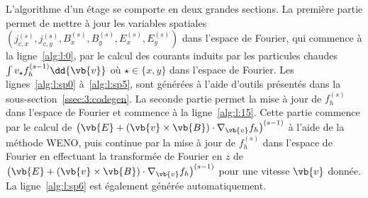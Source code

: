 L'algorithme d'un étage se comporte en deux grandes sections. La première partie permet de mettre à jour les variables spatiales $(j_{c,x}^{(s)},j_{c,y}^{(s)},B_x^{(s)},B_y^{(s)},E_x^{(s)},E_y^{(s)})$ dans l'espace de Fourier, qui commence à la ligne~\ref{alg:l:0}, par le calcul des courants induits par les particules chaudes $\int v_\star f_h^{(s-1)}\dd{\vb{v}}$ où $\star\in\{x,y\}$ dans l'espace de Fourier. Les lignes~\ref{alg:l:sp0} à~\ref{alg:l:sp5}, sont générées à l'aide d'outils présentés dans la sous-section~\ref{ssec:3:codegen}. La seconde partie permet la mise à jour de $f_h^{(s)}$ dans l'espace de Fourier et commence à la ligne~\ref{alg:l:15}. Cette partie commence par le calcul de $\left(\vb{E}+(\vb{v}\times\vb{B})\cdot\nabla_{\vb{v}}f_h\right)^{(s-1)}$ à l'aide de la méthode WENO, puis continue par la mise à jour de $f_h^{(s)}$ dans l'espace de Fourier en effectuant la transformée de Fourier en $z$ de $\left(\vb{E}+(\vb{v}\times\vb{B})\cdot\nabla_{\vb{v}}f_h\right)^{(s-1)}$ pour une vitesse $\vb{v}$ donnée. La ligne~\ref{alg:l:sp6} est également générée automatiquement.


